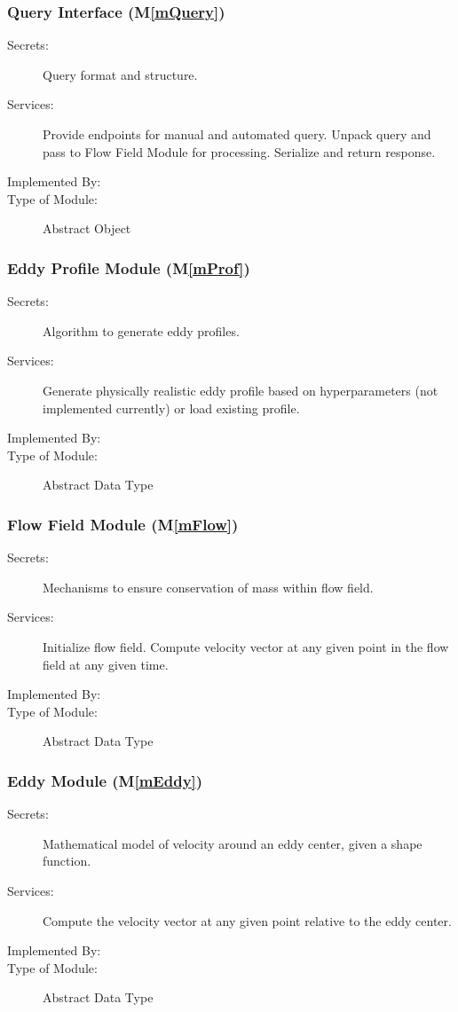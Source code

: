 \documentclass[12pt, titlepage]{article}
\newcommand{\mref}[1]{M\ref{#1}}
\begin{document}
\subsubsection{Query Interface (\mref{mQuery})}
\begin{description}
\item[Secrets:]Query format and structure.
\item[Services:]Provide endpoints for manual and automated query. Unpack query and pass to Flow Field Module for processing. Serialize and return response.
\item[Implemented By:] \progname{}
\item[Type of Module:] Abstract Object
\end{description}

\subsubsection{Eddy Profile Module (\mref{mProf})}
\begin{description}
\item[Secrets:]Algorithm to generate eddy profiles.
\item[Services:]Generate physically realistic eddy profile based on hyperparameters (not implemented currently) or load existing profile.
\item[Implemented By:] \progname{}
\item[Type of Module:] Abstract Data Type
\end{description}

\subsubsection{Flow Field Module (\mref{mFlow})}
\begin{description}
\item[Secrets:]Mechanisms to ensure conservation of mass within flow field.
\item[Services:]Initialize flow field. Compute velocity vector at any given point in the flow field at any given time.
\item[Implemented By:] \progname{}
\item[Type of Module:] Abstract Data Type
\end{description}

\subsubsection{Eddy Module (\mref{mEddy})}
\begin{description}
\item[Secrets:]Mathematical model of velocity around an eddy center, given a shape function.
\item[Services:]Compute the velocity vector at any given point relative to the eddy center.
\item[Implemented By:] \progname{}
\item[Type of Module:] Abstract Data Type
\end{description}
\end{document}
